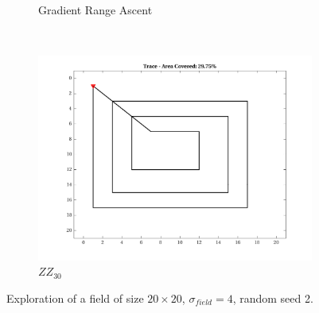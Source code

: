 \begin{figure}[htb!]
\begin{subfigure}[t]{0.3333\textwidth}
        \caption{Gradient Range Ascent}
    \end{subfigure}%
    \\
    \begin{subfigure}[t]{0.3333\textwidth}
        \centering
        \includegraphics[width=\linewidth]{figures/hbresults/path_zz_40p_20x20_sf_4_seed_2.png}
        \captionsetup{skip=0.20\baselineskip,size=footnotesize}
        \caption{$ZZ_{30}$}
    \end{subfigure}%
    \captionsetup{skip=0.20\baselineskip}
    \caption{Exploration of a field of size $20 \times 20$, $\sigma_{field} = 4$, random seed 2.}
    \label{fig:nbvpathcomp}
\end{figure}

